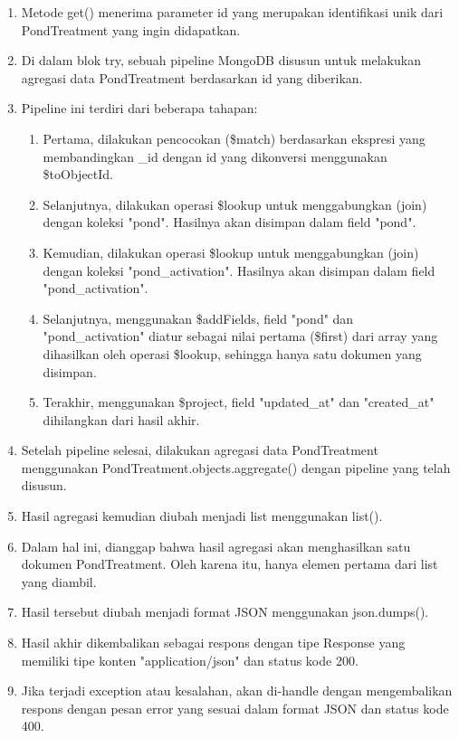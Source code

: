 \begin{enumerate}[1.]
\begin{enumerate}
\item Metode get() menerima parameter id yang merupakan identifikasi unik dari PondTreatment yang ingin didapatkan.
\item Di dalam blok try, sebuah pipeline MongoDB disusun untuk melakukan agregasi data PondTreatment berdasarkan id yang diberikan.
\item Pipeline ini terdiri dari beberapa tahapan:
\begin{enumerate}
\item Pertama, dilakukan pencocokan (\$match) berdasarkan ekspresi yang membandingkan \_id dengan id yang dikonversi menggunakan \$toObjectId.
\item Selanjutnya, dilakukan operasi \$lookup untuk menggabungkan (join) dengan koleksi "pond". Hasilnya akan disimpan dalam field "pond".
\item Kemudian, dilakukan operasi \$lookup untuk menggabungkan (join) dengan koleksi "pond\_activation". Hasilnya akan disimpan dalam field "pond\_activation".
\item Selanjutnya, menggunakan \$addFields, field "pond" dan "pond\_activation" diatur sebagai nilai pertama (\$first) dari array yang dihasilkan oleh operasi \$lookup, sehingga hanya satu dokumen yang disimpan.
\item Terakhir, menggunakan \$project, field "updated\_at" dan "created\_at" dihilangkan dari hasil akhir.
\end{enumerate}
\item Setelah pipeline selesai, dilakukan agregasi data PondTreatment menggunakan PondTreatment.objects.aggregate() dengan pipeline yang telah disusun.
\item Hasil agregasi kemudian diubah menjadi list menggunakan list().
\item Dalam hal ini, dianggap bahwa hasil agregasi akan menghasilkan satu dokumen PondTreatment. Oleh karena itu, hanya elemen pertama dari list yang diambil.
\item Hasil tersebut diubah menjadi format JSON menggunakan json.dumps().
\item Hasil akhir dikembalikan sebagai respons dengan tipe Response yang memiliki tipe konten "application/json" dan status kode 200.
\item Jika terjadi exception atau kesalahan, akan di-handle dengan mengembalikan respons dengan pesan error yang sesuai dalam format JSON dan status kode 400.
\end{enumerate}


\end{enumerate}
